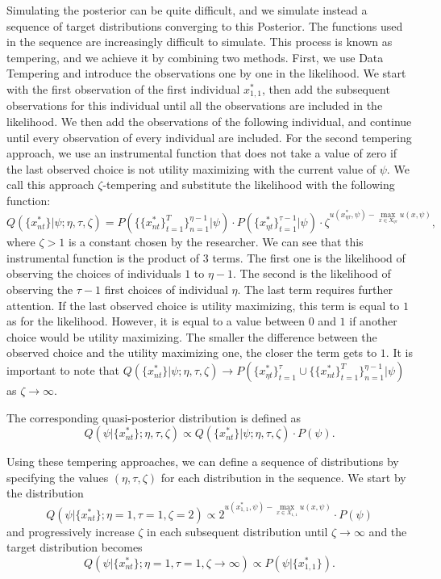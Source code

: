 \documentclass[12pt]{article}
\begin{document}
Simulating the posterior can be quite difficult, and we simulate instead a sequence of target distributions converging to this Posterior. The functions used in the sequence are increasingly difficult to simulate. This process is known as tempering, and we achieve it by combining two methods. First, we use Data Tempering and introduce the observations one by one in the likelihood. We start with the first observation of the first individual $x_{1,1}^*$, then add the subsequent observations for this individual until all the observations are included in the likelihood. We then add the observations of the following individual, and continue until every observation of every individual are included. For the second tempering approach, we use an instrumental function that does not take a value of zero if the last observed choice is not utility maximizing with the current value of $\psi$. We call this approach $\zeta$-tempering and substitute the likelihood with the following function:  
$$Q(\{x_{nt}^*\}|\psi;\eta,\tau,\zeta) = P(\{\{x_{nt}^*\}_{t=1}^T\}_{n=1}^{\eta-1}|\psi) \cdot  P(\{x_{\eta t}^*\}_{t=1}^{\tau-1}|\psi) \cdot \zeta^{ u(x_{\eta \tau}^*,\psi) - \max_{x \in X_{\eta \tau}} u(x,\psi)},$$
where $\zeta>1$ is a constant chosen by the researcher. We can see that this instrumental function is the product of $3$ terms. The first one is the likelihood of observing the choices of individuals $1$ to $\eta-1$. The second is the likelihood of observing the $\tau-1$ first choices of individual $\eta$. The last term requires further attention. If the last observed choice is utility maximizing, this term is equal to $1$ as for the likelihood. However, it is equal to a value between $0$ and $1$ if another choice would be utility maximizing. The smaller the difference between the observed choice and the utility maximizing one, the closer the term gets to $1$. It is important to note that $Q(\{x_{nt}^*\}|\psi;\eta,\tau,\zeta) \to P(\{x_{\eta t}^*\}_{t=1}^\tau \cup \{\{x_{nt}^*\}_{t=1}^T\}_{n=1}^{\eta-1}|\psi)$ as $\zeta \to \infty$. 

The corresponding quasi-posterior distribution is defined as
$$ Q(\psi|\{x_{nt}^*\};\eta,\tau,\zeta) \propto Q(\{x_{nt}^*\}|\psi;\eta,\tau,\zeta) \cdot P(\psi) .$$

Using these tempering approaches, we can define a sequence of distributions by specifying the values $(\eta,\tau,\zeta)$ for each distribution in the sequence. We start by the distribution 
$$Q(\psi|\{x_{nt}^*\};\eta=1,\tau=1,\zeta=2) \propto 2^{ u(x_{1,1}^*,\psi) - \max_{x \in X_{1,1}} u(x,\psi)} \cdot P(\psi)$$ 
and progressively increase $\zeta$ in each subsequent distribution until $\zeta \to \infty$ and the target distribution becomes
$$ Q(\psi|\{x_{nt}^*\};\eta=1,\tau=1,\zeta \to \infty) \propto  P(\psi|\{x_{1,1}^*\}).$$
\end{document}
